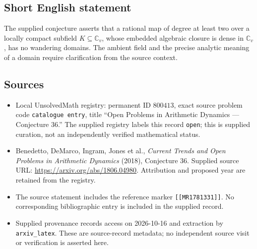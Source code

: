 \documentclass[11pt]{article}
\begin{document}
\subsection{Short English statement}
The supplied conjecture asserts that a rational map of degree at least two over a locally compact subfield \(K\subseteq\mathbb C_v\), whose embedded algebraic closure is dense in \(\mathbb C_v\), has no wandering domains. The ambient field and the precise analytic meaning of a domain require clarification from the source context.
\subsection{Sources}
\begin{itemize}
\item Local UnsolvedMath registry: permanent ID \(800413\), exact source problem code \texttt{catalogue entry}, title ``Open Problems in Arithmetic Dynamics --- Conjecture 36.'' The supplied registry labels this record \texttt{open}; this is supplied curation, not an independently verified mathematical status.
\item Benedetto, DeMarco, Ingram, Jones et al., \emph{Current Trends and Open Problems in Arithmetic Dynamics} (2018), Conjecture 36. Supplied source URL: \url{https://arxiv.org/abs/1806.04980}. Attribution and proposed year are retained from the registry.
\item The source statement includes the reference marker \texttt{[[MR1781331]]}. No corresponding bibliographic entry is included in the supplied record.
\item Supplied provenance records access on 2026-10-16 and extraction by \texttt{arxiv\_latex}. These are source-record metadata; no independent source visit or verification is asserted here.
\end{itemize}
\end{document}
